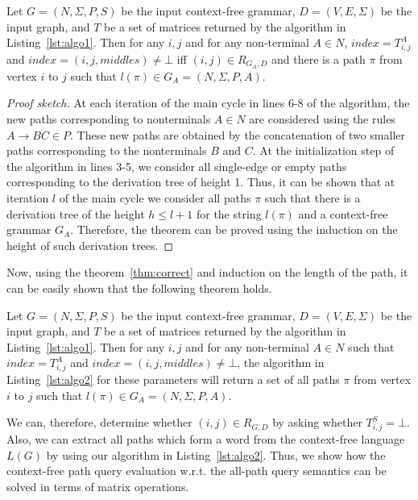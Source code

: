 \begin{mytheorem}\label{thm:correct}
Let $G = (N, \Sigma, P, S)$ be the input context-free grammar, $D = (V, E, \Sigma)$ be the input graph, and $T$ be a set of matrices returned by the algorithm in Listing~\ref{lst:algo1}. Then for any $i, j$ and for any non-terminal $A \in N$, $index = T^A_{i,j}$ and $index = (i,j,middles) \neq \bot$ iff $(i,j) \in R_{G_A, D}$ and there is a path $\pi$ from vertex $i$ to $j$ such that $l(\pi) \in G_A = (N,\Sigma,P,A)$.
\end{mytheorem}
\begin{proof}[Proof sketch]
	At each iteration of the main cycle in lines 6-8 of the algorithm, the new paths corresponding to nonterminals $A \in N$ are considered using the rules $A \to B C \in P$. These new paths are obtained by the concatenation of two smaller paths corresponding to the nonterminals $B$ and $C$. At the initialization step of the algorithm in lines 3-5, we consider all single-edge or empty paths corresponding to the derivation tree of height 1. Thus, it can be shown that at iteration $l$ of the main cycle we consider all paths $\pi$ such that there is a derivation tree of the height $h \leq l + 1$ for the string $l(\pi)$ and a context-free grammar $G_A$. Therefore, the theorem can be proved using the induction on the height of such derivation trees.	
\end{proof}

Now, using the theorem~\ref{thm:correct} and induction on the length of the path, it can be easily shown that the following theorem holds.

\begin{mytheorem}\label{thm:correct_extraction}
Let $G = (N, \Sigma, P, S)$ be the input context-free grammar, $D = (V, E, \Sigma)$ be the input graph, and $T$ be a set of matrices returned by the algorithm in Listing~\ref{lst:algo1}. Then for any $i, j$ and for any non-terminal $A \in N$ such that $index = T^A_{i,j}$ and $index = (i,j,middles) \neq \bot$, the algorithm in Listing~\ref{lst:algo2} for these parameters will return a set of all paths $\pi$ from vertex $i$ to $j$ such that $l(\pi) \in G_A = (N,\Sigma,P,A)$.
\end{mytheorem}

We can, therefore, determine whether $(i,j) \in R_{G, D}$ by asking whether $T^S_{i,j} = \bot$. Also, we can extract all paths which form a word from the context-free language $L(G)$ by using our algorithm in Listing~\ref{lst:algo2}. Thus, we show how the context-free path query evaluation w.r.t. the all-path query semantics can be solved in terms of matrix operations.

